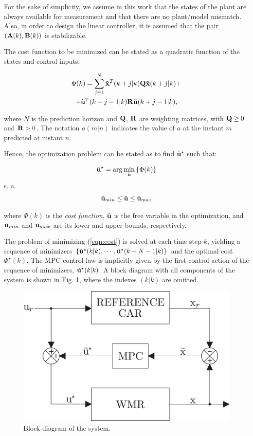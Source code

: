 \documentclass[conference]{IEEEtran} %
\begin{document}
For the sake of simplicity, we assume in this work that the states of the
plant are always available for measurement and that there are no plant/model
mismatch. Also, in order to design the linear controller, it is assumed that
the pair $({\bf A}(k),{\bf B}(k))$ is stabilizable.

The cost function to be minimized can be stated as a quadratic function of
the states and control inputs:

\begin{multline}\label{eqn:cost}
	\Phi(k) = \sum_{j=1}^{N}\tilde{\bf x}^T(k+j|k){\bf Q}\tilde{\bf x}(k+j|k) + \\ + \tilde{\bf u}^T(k+j-1|k){\bf R}\tilde{\bf u}(k+j-1|k),
\end{multline}

\noindent where $N$ is the prediction horizon and ${\bf Q}$, ${\bf R}$ are
weighting matrices, with ${\bf Q}\geq 0$ and ${\bf R}>0$. The notation
$a(m|n)$ indicates the value of $a$ at the instant $m$ predicted at instant
$n$.

Hence, the optimization problem can be stated as to find $\tilde{\bf
u}^\star$ such that:

\begin{equation*}
	\tilde{\bf u}^\star = \arg\min_{\tilde{\bf u}}\left\{\Phi(k)\right\}
\end{equation*}
\noindent s. a.
\begin{equation*}
	\tilde{\bf u}_{min} \leq \tilde{\bf u} \leq \tilde{\bf u}_{max}
\end{equation*}

\noindent where $\Phi(k)$ is the {\em cost function}, $\tilde{\bf u}$ is the
free variable in the optimization, and $\tilde{\bf u}_{min}$ and
$\tilde{\bf u}_{max}$ are its lower and upper bounds, respectively.

The problem of minimizing (\ref{eqn:cost}) is solved at each time step $k$,
yielding a sequence of minimizers $\{\tilde{\bf
u}^\star(k|k),\cdots,\tilde{\bf u}^\star(k+N-1|k)\}$ and the optimal cost
$\Phi^\star(k)$. The MPC control law is implicitly given by the first
control action of the sequence of minimizers, $\tilde{\bf u}^\star(k|k)$. A
block diagram with all components of the system is shown in Fig.
\ref{fig:bloco}, where the indexes $(k|k)$ are omitted.

\begin{figure}[htbp]
	\centering
	\includegraphics[width=.82\linewidth]{Figures/bloco.eps}
	\caption{Block diagram of the system.}
	\label{fig:bloco}
\end{figure}
\end{document}
